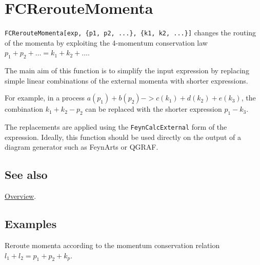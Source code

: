 \documentclass[../FeynCalcManual.tex]{subfiles}
\begin{document}
\hypertarget{fcreroutemomenta}{
\section{FCRerouteMomenta}\label{fcreroutemomenta}}

\texttt{FCRerouteMomenta[\allowbreak{}exp,\ \allowbreak{}\{\allowbreak{}p1,\ \allowbreak{}p2,\ \allowbreak{}...\},\ \allowbreak{}\{\allowbreak{}k1,\ \allowbreak{}k2,\ \allowbreak{}...\}]}
changes the routing of the momenta by exploiting the 4-momentum
conservation law \(p_1+p_2+ \ldots = k_1+k_2+ \ldots\).

The main aim of this function is to simplify the input expression by
replacing simple linear combinations of the external momenta with
shorter expressions.

For example, in a process \(a(p_1) + b(p_2) -> c(k_1)+ d(k_2)+ e(k_3)\),
the combination \(k_1+k_2-p_2\) can be replaced with the shorter
expression \(p_1-k_3\).

The replacements are applied using the \texttt{FeynCalcExternal} form of
the expression. Ideally, this function should be used directly on the
output of a diagram generator such as FeynArts or QGRAF.

\subsection{See also}

\hyperlink{toc}{Overview}.

\subsection{Examples}

Reroute momenta according to the momentum conservation relation
\(l_1+l_2=p_1+p_2+k_p\).
\end{document}
